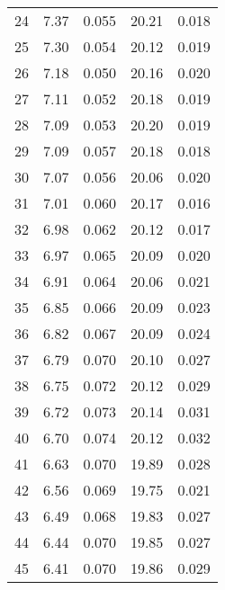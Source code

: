 \begin{table}
\begin{tabular}{c|ll|ll}
24 & 7.37 & 0.055 & 20.21 & 0.018 \\
25 & 7.30 & 0.054 & 20.12 & 0.019 \\
26 & 7.18 & 0.050 & 20.16 & 0.020 \\
27 & 7.11 & 0.052 & 20.18 & 0.019 \\
28 & 7.09 & 0.053 & 20.20 & 0.019 \\
29 & 7.09 & 0.057 & 20.18 & 0.018 \\
30 & 7.07 & 0.056 & 20.06 & 0.020 \\
31 & 7.01 & 0.060 & 20.17 & 0.016 \\
32 & 6.98 & 0.062 & 20.12 & 0.017 \\
33 & 6.97 & 0.065 & 20.09 & 0.020 \\
34 & 6.91 & 0.064 & 20.06 & 0.021 \\
35 & 6.85 & 0.066 & 20.09 & 0.023 \\
36 & 6.82 & 0.067 & 20.09 & 0.024 \\
37 & 6.79 & 0.070 & 20.10 & 0.027 \\
38 & 6.75 & 0.072 & 20.12 & 0.029 \\
39 & 6.72 & 0.073 & 20.14 & 0.031 \\
40 & 6.70 & 0.074 & 20.12 & 0.032 \\
41 & 6.63 & 0.070 & 19.89 & 0.028 \\
42 & 6.56 & 0.069 & 19.75 & 0.021 \\
43 & 6.49 & 0.068 & 19.83 & 0.027 \\
44 & 6.44 & 0.070 & 19.85 & 0.027 \\
45 & 6.41 & 0.070 & 19.86 & 0.029 \\
               \hline
        \end{tabular}
    \end{table}
    \clearpage

